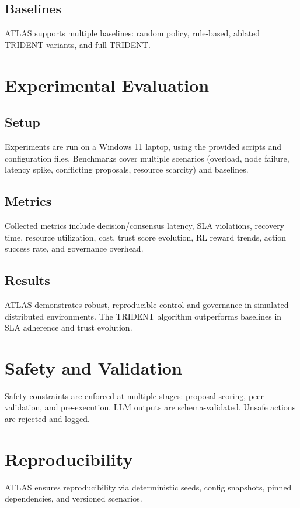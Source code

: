 \documentclass[conference]{IEEEtran}
\begin{document}
\subsection{Baselines}
ATLAS supports multiple baselines: random policy, rule-based, ablated TRIDENT variants, and full TRIDENT.

\section{Experimental Evaluation}
\subsection{Setup}
Experiments are run on a Windows 11 laptop, using the provided scripts and configuration files. Benchmarks cover multiple scenarios (overload, node failure, latency spike, conflicting proposals, resource scarcity) and baselines.

\subsection{Metrics}
Collected metrics include decision/consensus latency, SLA violations, recovery time, resource utilization, cost, trust score evolution, RL reward trends, action success rate, and governance overhead.

\subsection{Results}
ATLAS demonstrates robust, reproducible control and governance in simulated distributed environments. The TRIDENT algorithm outperforms baselines in SLA adherence and trust evolution.

\section{Safety and Validation}
Safety constraints are enforced at multiple stages: proposal scoring, peer validation, and pre-execution. LLM outputs are schema-validated. Unsafe actions are rejected and logged.

\section{Reproducibility}
ATLAS ensures reproducibility via deterministic seeds, config snapshots, pinned dependencies, and versioned scenarios.
\end{document}
